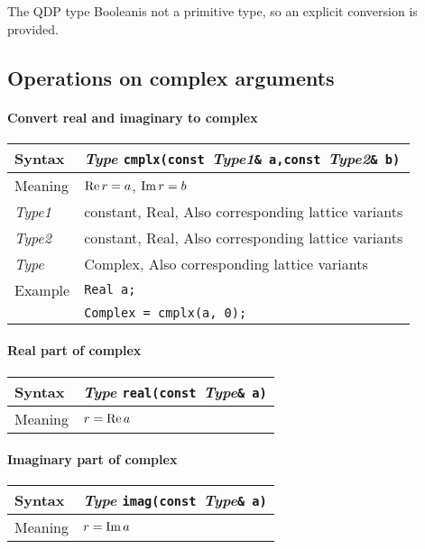 \documentclass[12pt,letterpaper]{article}
\renewcommand{\Re}{\mathop{\rm Re}}
\renewcommand{\Im}{\mathop{\rm Im}}
\newcommand{\tConstant}{constant}
\newcommand{\tReal}{Real}
\newcommand{\tComplex}{Complex}
\newcommand{\tBoolean}{Boolean}
\newcommand{\simLatticeVariants}{Also corresponding lattice variants}
\newcommand{\protoUnaryQual}[1]{{\it Type }{\tt #1}{\tt (const }{\it Type}{\tt \& a)}}
\newcommand{\protoBinaryQual}[1]{{\it Type }{\tt #1}{\tt (const }{\it Type1}{\tt \& a,}{\tt const }{\it Type2}{\tt \& b)}}
\begin{document}
The QDP type \tBoolean is not a primitive type, so an explicit conversion is provided.

\subsection{Operations on complex arguments}

\paragraph{Convert real and imaginary to complex}

\begin{flushleft}
  \begin{tabular}{|l|l|}
  \hline
  Syntax      & \protoBinaryQual{cmplx} \\
  \hline
  Meaning     & $\Re r = a$, $\Im r = b$ \\
  \hline
  {\it Type1} & \tConstant, \tReal, \simLatticeVariants\\
  {\it Type2} & \tConstant, \tReal, \simLatticeVariants\\
  \hline
  {\it Type}  & \tComplex, \simLatticeVariants\\
  \hline
  Example     & \verb|Real a;|\\
              & \verb|Complex = cmplx(a, 0);|\\
  \hline
  \end{tabular}
\end{flushleft}

\paragraph{Real part of complex}

\begin{flushleft}
  \begin{tabular}{|l|l|}
  \hline
  Syntax      & \protoUnaryQual{\tt real}  \\
  \hline
  Meaning     & $r = \Re a$ \\
  \hline
  \end{tabular}
\end{flushleft}

\paragraph{Imaginary part of complex}

\begin{flushleft}
  \begin{tabular}{|l|l|}
  \hline
  Syntax      & \protoUnaryQual{\tt imag}  \\
  \hline
  Meaning     & $r = \Im a$ \\
  \hline
  \end{tabular}
\end{flushleft}
\end{document}

